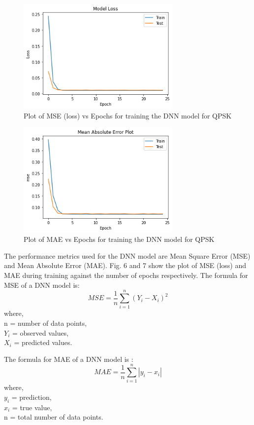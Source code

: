 \documentclass[conference]{IEEEtran}
\begin{document}
\begin{figure}[htbp]
\centerline{\includegraphics[width=8cm]{loss_qpsk.png}}
\caption{Plot of MSE (loss) vs Epochs for training the DNN model for QPSK}
\label{loss_qpsk}
\end{figure}

\begin{figure}[htbp]
\centerline{\includegraphics[width=8cm]{mae_qpsk.png}}
\caption{Plot of MAE vs Epochs for training the DNN model for QPSK}
\label{mae_qpsk}
\end{figure}

The performance metrics used for the DNN model are Mean Square Error (MSE) and Mean Absolute Error (MAE). Fig. 6 and 7 show the plot of MSE (loss) and MAE during training against the number of epochs respectively. The formula for MSE of a DNN model is:
\begin{equation}
     MSE = \displaystyle\frac{1}{n}\sum_{i=1}^{n}(Y_i - X_i)^2
\label{mse}
\end{equation}
where,\\
{n}	=	number of data points,\\
${Y_i}$	=	observed values,\\
${X_i}$	=	predicted values.

The formula for MAE of a DNN model is : 
\begin{equation}
    MAE = \frac{1}{n}\sum_{i=1}^{n}|y_i - x_i|
\end{equation}
where, \\
${y_i}$	=	prediction, \\
${x_i}$	=	true value, \\
{n}	=	total number of data points.\\
\end{document}
